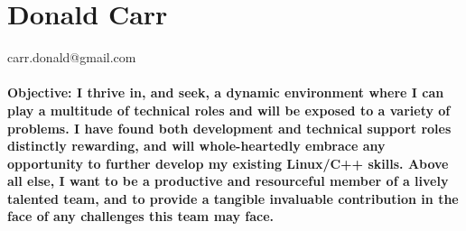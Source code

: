 \documentclass{article}
\begin{document}

\centering
\section*{Donald Carr}
carr.donald@gmail.com \\
\hspace*{\fill} \\

\bf{Objective:}
I thrive in, and seek, a dynamic environment where I can play a multitude of technical roles and will be exposed to a variety of problems. I have found both development and technical support roles distinctly rewarding, and will whole-heartedly embrace any opportunity to further develop my existing Linux/C++ skills. Above all else, I want to be a productive and resourceful member of a lively talented team, and to provide a tangible invaluable contribution in the face of any challenges this team may face.
\end{document}
